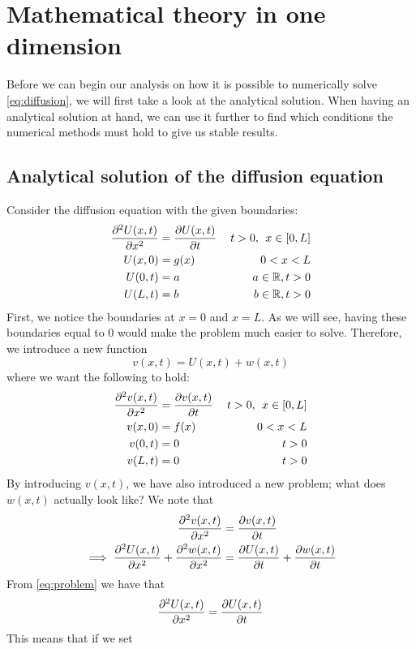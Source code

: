 \documentclass[12pt,english,a4paper]{article}
\begin{document}
\section{Mathematical theory in one dimension}
Before we can begin our analysis on how it is possible to numerically solve \vref{eq:diffusion}, we will first take a look at the analytical solution. When having an analytical solution at hand, we can use it further to find which conditions the numerical methods must hold to give us stable results.
\subsection{Analytical solution of the diffusion equation}\label{sec:analyticalOneDim}
Consider the diffusion equation with the given boundaries:
\begin{equation}\label{eq:problem}
\begin{aligned}
\pdv[2]{U(x,t)}{x} &= \pdv{U(x,t)}{t} &\: t>0, \:\:x\in[0,L] \\
U(x,0) &= g(x)  &0 < x < L\\
U(0,t) &=  a & a \in \mathbb{R},  t>0 \\
U(L,t) &= b &b \in \mathbb{R}, t>0
\end{aligned}
\end{equation}
First, we notice the boundaries at \(x = 0\) and \(x = L\). As we will see, having these boundaries equal to 0 would make the problem much easier to solve. Therefore, we introduce a new function
\[
v(x,t) = U(x,t) + w(x,t)
\]
where we want the following to hold:
\begin{equation}\label{eq:dummy}
\begin{aligned}
\pdv[2]{v(x,t)}{x} &= \pdv{v(x,t)}{t} &\: t>0, \:\:x\in[0,L] \\
v(x,0) &= f(x)  &0 < x < L\\
v(0,t) &=  0 &  t>0 \\
v(L,t) &= 0 & t>0
\end{aligned}
\end{equation}
By introducing \(v(x,t)\), we have also introduced a new problem; what does \(w(x,t)\) actually look like? We note that
\begin{alignat*}{2}
\pdv[2]{v(x,t)}{x} &= \pdv{v(x,t)}{t}  \\
\implies \pdv[2]{U(x,t)}{x} + \pdv[2]{w(x,t)}{x} &= \pdv{U(x,t)}{t} + \pdv{w(x,t)}{t}
\end{alignat*}
From \ref{eq:problem} we have that
\[
\pdv[2]{U(x,t)}{x} = \pdv{U(x,t)}{t}
\]
This means that if we set
\end{document}
